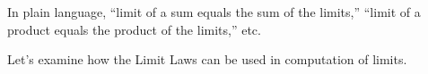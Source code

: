 \documentclass{ximera}
\begin{document}
In plain language, ``limit of a sum equals the sum of the limits,'' ``limit of a product equals the product of the limits,'' etc.

Let's examine how the Limit Laws can be used in computation of limits.

\end{document}
